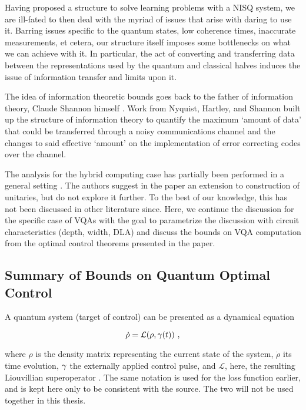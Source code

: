 
Having proposed a structure to solve learning problems with a NISQ system, we
are ill-fated to then deal with the myriad of issues that arise with daring to
use it. Barring issues specific to the quantum states, low coherence times,
inaccurate measurements, et cetera, our structure itself
imposes some bottlenecks on what we can achieve with it. In particular, the act
of converting and transferring data between the representations used by the
quantum and classical halves induces the issue of information transfer and
limits upon it. 

The idea of information theoretic bounds goes back to the father of information
theory, Claude Shannon himself \cite{shannon1948mathematical}. Work from
Nyquist, Hartley, and Shannon \cite{hartley1928transmission} built up the
structure of information theory to quantify the maximum `amount of data' that
could be transferred through a noisy communications channel and the changes to
said effective `amount' on the implementation of error correcting codes over the
channel.

The analysis for the hybrid computing case has partially been performed in a
general setting \cite{lloyd2014information}. The authors suggest in the paper an
extension to construction of unitaries, but do not explore it further. To the
best of our knowledge, this has not been discussed in other literature since.
Here, we continue the discussion for the specific case of VQAs with the goal to
parametrize the discussion with circuit characteristics (depth, width, DLA) and
discuss the bounds on VQA computation from the optimal control theorems
presented in the paper.

\subsection{Summary of Bounds on Quantum Optimal Control}
A quantum system (target of control) can be presented as a dynamical equation

\begin{equation}
    \dot{\rho} = \mathcal{L}(\rho, \gamma(t))~,
\end{equation}

where \(\rho\) is the density matrix representing the current state of the
system, \(\dot{\rho}\) its time evolution, \(\gamma\) the externally
applied control pulse, and \(\mathcal{L}\), here, the resulting Liouvillian
superoperator \cite[see][section IV]{manzano2020lindblad}. The same notation is
used for the loss function earlier, and is kept here only to be consistent with
the source. The two will not be used together in this thesis.

